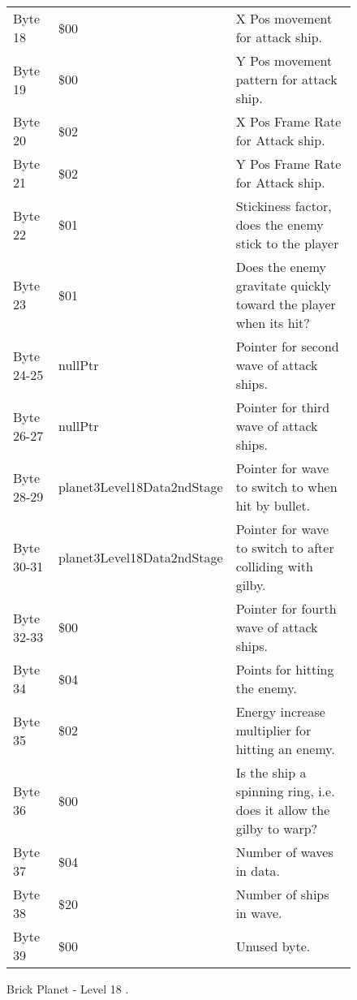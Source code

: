 \begin{figure}[H]
{\begin{adjustbox}{width=12cm}
\begin{tabular}{lll}
 Byte 18    & \$00                        & X Pos movement for attack ship.                                     \\
 Byte 19    & \$00                        & Y Pos movement pattern for attack ship.                             \\
 Byte 20    & \$02                        & X Pos Frame Rate for Attack ship.                                   \\
 Byte 21    & \$02                        & Y Pos Frame Rate for Attack ship.                                   \\
 Byte 22    & \$01                        & Stickiness factor, does the enemy stick to the player               \\
 Byte 23    & \$01                        & Does the enemy gravitate quickly toward the player when its hit?    \\
 Byte 24-25 & nullPtr                    & Pointer for second wave of attack ships.                            \\
 Byte 26-27 & nullPtr                    & Pointer for third wave of attack ships.                             \\
 Byte 28-29 & planet3Level18Data2ndStage & Pointer for wave to switch to when hit by bullet.                   \\
 Byte 30-31 & planet3Level18Data2ndStage & Pointer for  wave to switch to after colliding with gilby.          \\
 Byte 32-33 & \$00                        & Pointer for fourth wave of attack ships.                            \\
 Byte 34    & \$04                        & Points for hitting the enemy.                                       \\
 Byte 35    & \$02                        & Energy increase multiplier for hitting an enemy.                    \\
 Byte 36    & \$00                        & Is the ship a spinning ring, i.e. does it allow the gilby to warp?  \\
 Byte 37    & \$04                        & Number of waves in data.                                            \\
 Byte 38    & \$20                        & Number of ships in wave.                                            \\
 Byte 39    & \$00                        & Unused byte.                                                        \\
\bottomrule
\end{tabular}

  \end{adjustbox}

  }\caption*{Brick Planet - Level 18
.}
\end{figure}

